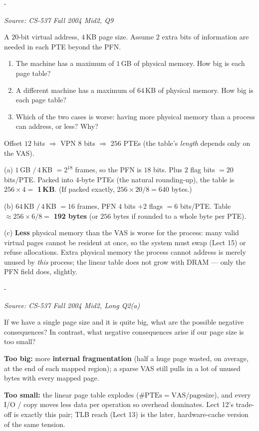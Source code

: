 \documentclass[11pt,a4paper]{article}
\makeatletter
\newcommand{\keepspace}[1]{\par\penalty-100\begingroup
  \setlength{\dimen@}{#1}\dimen@ii\pagegoal\advance\dimen@ii-\pagetotal
  \ifdim\dimen@>\dimen@ii\ifdim\dimen@ii>\z@\vfil\fi\break\fi\endgroup}
\newcounter{qn}[section]
\newenvironment{Qn}[4]{%
  \refstepcounter{qn}\keepspace{7\baselineskip}%
  \begin{tcolorbox}[qboxstyle, title={Q\thesection.\theqn\ \ [#1 \textbar\ #2]\ \ #4}]%
  {\footnotesize\color{g3}\textit{Source: #3}}\par\smallskip%
}{%
  \end{tcolorbox}%
}
\newenvironment{Sol}{%
  \begin{tcolorbox}[sboxstyle, title={Solution}]%
}{%
  \end{tcolorbox}\vspace{0.35em}%
}
\makeatother
\begin{document}
\begin{Qn}{Medium}{Lect 12}{CS-537 Fall 2004 Mid2, Q9}{PTE width follows physical memory, not the VAS}
A $20$-bit virtual address, $4$\,KB page size. Assume $2$ extra bits
of information are needed in each PTE beyond the PFN.
\begin{enumerate}
  \item The machine has a maximum of $1$\,GB of physical memory. How
        big is each page table?
  \item A different machine has a maximum of $64$\,KB of physical
        memory. How big is each page table?
  \item Which of the two cases is worse: having more physical memory
        than a process can address, or less? Why?
\end{enumerate}
\end{Qn}
\begin{Sol}
Offset $12$ bits $\Rightarrow$ VPN $8$ bits $\Rightarrow$ $256$ PTEs
(the table's \emph{length} depends only on the VAS).

(a) $1$\,GB $/\,4$\,KB $=2^{18}$ frames, so the PFN is $18$ bits.
Plus $2$ flag bits $=20$ bits/PTE. Packed into $4$-byte PTEs (the
natural rounding-up), the table is $256\times 4=$ \textbf{1\,KB}.
(If packed exactly, $256\times 20/8=640$ bytes.)

(b) $64$\,KB $/\,4$\,KB $=16$ frames, PFN $4$ bits $+2$ flags $=6$
bits/PTE. Table $\approx 256\times 6/8=$ \textbf{192 bytes}
(or $256$ bytes if rounded to a whole byte per PTE).

(c) \textbf{Less} physical memory than the VAS is worse for the
process: many valid virtual pages cannot be resident at once, so the
system must swap (Lect 15) or refuse allocations. Extra physical
memory the process cannot address is merely unused by \emph{this}
process; the linear table does not grow with DRAM --- only the PFN
field does, slightly.
\end{Sol}

\begin{Qn}{Easy-Medium}{Lect 12}{CS-537 Fall 2004 Mid2, Long Q2(a)}{Too-big vs.\ too-small a page}
If we have a single page size and it is quite big, what are the
possible negative consequences? In contrast, what negative
consequences arise if our page size is too small?
\end{Qn}
\begin{Sol}
\textbf{Too big:} more \textbf{internal fragmentation} (half a huge
page wasted, on average, at the end of each mapped region); a
sparse VAS still pulls in a lot of unused bytes with every mapped
page.

\textbf{Too small:} the linear page table explodes ($\#\mathrm{PTEs}=\mathrm{VAS}/\mathrm{pagesize}$),
and every I/O / copy moves less data per operation so overhead
dominates. Lect 12's trade-off is exactly this pair; TLB reach
(Lect 13) is the later, hardware-cache version of the same tension.
\end{Sol}
\end{document}
